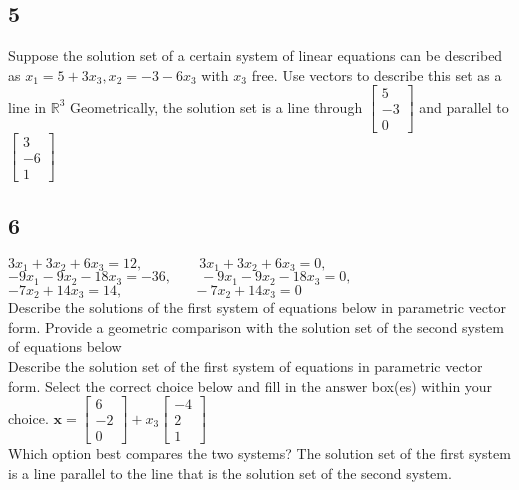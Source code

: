 \documentclass{article}
\begin{document}
\subsection*{5}
Suppose the solution set of a certain system of linear equations can be described as $x_1=5+3x_3, x_2=-3-6x_3$ with $x_3$ free. Use vectors to describe this set as a line in $\mathbb{R}^3$
Geometrically, the solution set is a line through $\begin{bmatrix}5\\-3\\0\end{bmatrix}$ and parallel to $\begin{bmatrix}3\\-6\\1\end{bmatrix}$
\subsection*{6}
$3x_1 + 3x_2 + 6x_3 = 12,\qquad  \qquad 3x_1 + 3x_2 + 6x_3 = 0,$\\
$-9x_1 - 9x_2 - 18x_3 = -36, \qquad -9x_1 - 9x_2 - 18x_3 = 0,$\\
$-7x_2 + 14x_3 = 14,\quad \qquad \qquad -7x_2 + 14x_3 = 0$\\[0.5in]
Describe the solutions of the first system of equations below in parametric vector form. Provide a geometric comparison with the solution set of the second system of equations below
\\Describe the solution set of the first system of equations in parametric vector form. Select the correct choice below and fill in the answer box(es) within your choice.
$\mathbf{x}=\begin{bmatrix}6\\-2\\0\end{bmatrix}  +x_3 \begin{bmatrix}-4\\2\\1\end{bmatrix}$
\\Which option best compares the two systems? The solution set of the first system is a line parallel to the line that is the solution set of the second system.
\end{document}
